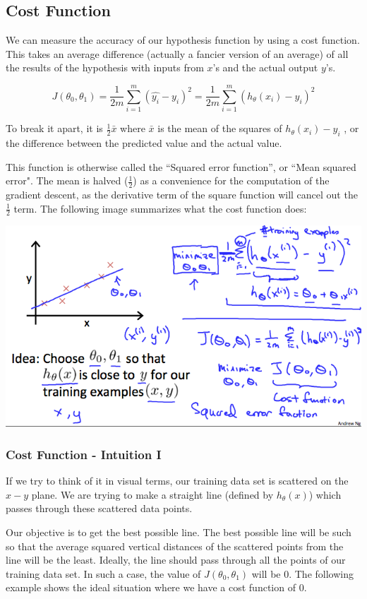 \documentclass[UTF8]{article}
\begin{document}
\subsection{Cost Function}

We can measure the accuracy of our hypothesis function by using a cost function. This takes an average difference (actually a fancier version of an average) of all the results of the hypothesis with inputs from $x$'s and the actual output $y$'s.

\[ J(\theta_0,\theta_1)=\frac{1}{2m}\sum_{i=1}^{m}(\hat{y_i} - y_i)^2=\frac{1}{2m}\sum_{i=1}^{m}(h_\theta{(x_i)} - {y_i})^2 \]

To break it apart, it is $\frac{1}{2}\bar{x}$ where $\bar{x}$ is the mean of the squares of $h_\theta(x_i) - y_i$ , or the difference between the predicted value and the actual value.

This function is otherwise called the ``Squared error function'', or ``Mean squared error". The mean is halved ($\frac{1}{2}$) as a convenience for the computation of the gradient descent, as the derivative term of the square function will cancel out the $\frac{1}{2}$ term. The following image summarizes what the cost function does:

\includegraphics[width = .8\textwidth]{NotePics/2_2_1.png}

\subsubsection{Cost Function - Intuition I}

If we try to think of it in visual terms, our training data set is scattered on the $x-y$ plane. We are trying to make a straight line (defined by $h_\theta(x)$) which passes through these scattered data points.

Our objective is to get the best possible line. The best possible line will be such so that the average squared vertical distances of the scattered points from the line will be the least. Ideally, the line should pass through all the points of our training data set. In such a case, the value of $J(\theta_0,\theta_1)$ will be 0. The following example shows the ideal situation where we have a cost function of 0.
\end{document}
